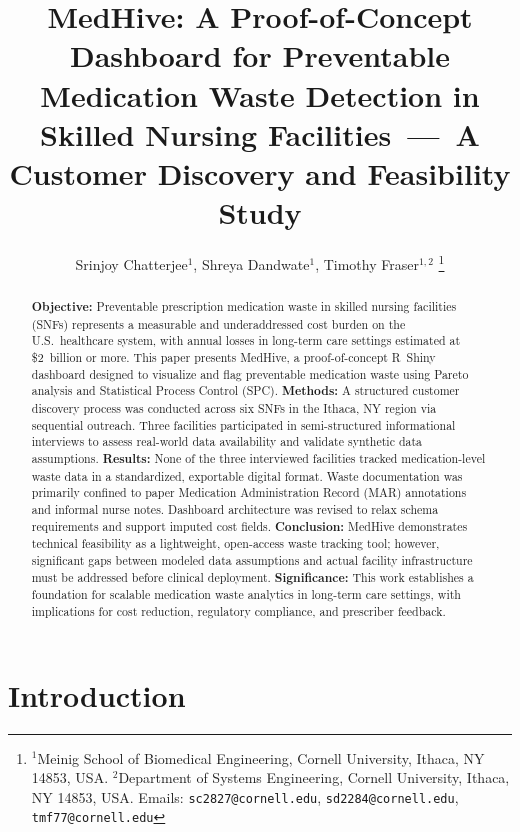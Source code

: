 \documentclass[letterpaper, 10pt, conference]{IEEEconf}
\title{\LARGE \bf
MedHive: A Proof-of-Concept Dashboard for Preventable Medication Waste
Detection in Skilled Nursing Facilities~---~A Customer Discovery and
Feasibility Study
}
\author{
Srinjoy Chatterjee$^{1}$, Shreya Dandwate$^{1}$, Timothy Fraser$^{1,2}$%
\thanks{$^{1}$Meinig School of Biomedical Engineering, Cornell University,
Ithaca, NY 14853, USA.
$^{2}$Department of Systems Engineering, Cornell University, Ithaca, NY 14853,
USA.
Emails: \texttt{sc2827@cornell.edu}, \texttt{sd2284@cornell.edu},
\texttt{tmf77@cornell.edu}}
}
\begin{document}
\maketitle
\thispagestyle{empty}
\pagestyle{empty}

\begin{abstract}

\textbf{Objective:} Preventable prescription medication waste in skilled nursing
facilities (SNFs) represents a measurable and underaddressed cost burden on the
U.S.\ healthcare system, with annual losses in long-term care settings estimated
at \$2~billion or more.
This paper presents MedHive, a proof-of-concept R~Shiny dashboard designed to
visualize and flag preventable medication waste using Pareto analysis and
Statistical Process Control (SPC).
\textbf{Methods:} A structured customer discovery process was conducted across
six SNFs in the Ithaca, NY region via sequential outreach.
Three facilities participated in semi-structured informational interviews to
assess real-world data availability and validate synthetic data assumptions.
\textbf{Results:} None of the three interviewed facilities tracked
medication-level waste data in a standardized, exportable digital format.
Waste documentation was primarily confined to paper Medication Administration
Record (MAR) annotations and informal nurse notes.
Dashboard architecture was revised to relax schema requirements and support
imputed cost fields.
\textbf{Conclusion:} MedHive demonstrates technical feasibility as a
lightweight, open-access waste tracking tool; however, significant gaps between
modeled data assumptions and actual facility infrastructure must be addressed
before clinical deployment.
\textbf{Significance:} This work establishes a foundation for scalable
medication waste analytics in long-term care settings, with implications for
cost reduction, regulatory compliance, and prescriber feedback.

\end{abstract}

\section{Introduction}
\end{document}
